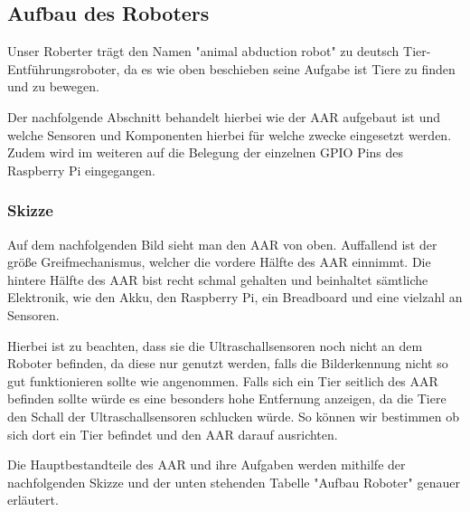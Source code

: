 \subsection{Aufbau des Roboters}

Unser Roberter trägt den Namen "animal abduction robot" zu deutsch Tier-Entführungsroboter, da es wie oben beschieben seine Aufgabe ist Tiere zu finden und zu bewegen.

Der nachfolgende Abschnitt behandelt hierbei wie der AAR aufgebaut ist und welche Sensoren und Komponenten hierbei für welche zwecke eingesetzt werden. Zudem wird im weiteren auf die Belegung der einzelnen GPIO Pins des Raspberry Pi eingegangen.

\subsubsection{Skizze}

Auf dem nachfolgenden Bild sieht man den AAR von oben. Auffallend ist der größe Greifmechanismus, welcher die vordere Hälfte des AAR einnimmt. Die hintere Hälfte des AAR bist recht schmal gehalten und beinhaltet sämtliche Elektronik, wie den Akku, den Raspberry Pi, ein Breadboard und eine vielzahl an Sensoren. 

Hierbei ist zu beachten, dass sie die Ultraschallsensoren noch nicht an dem Roboter befinden, da diese nur genutzt werden, falls die Bilderkennung nicht so gut funktionieren sollte wie angenommen.
Falls sich ein Tier seitlich des AAR befinden sollte würde es eine besonders hohe Entfernung anzeigen, da die Tiere den Schall der Ultraschallsensoren schlucken würde. So können wir bestimmen ob sich dort ein Tier befindet und den AAR darauf ausrichten. 

Die Hauptbestandteile des AAR und ihre Aufgaben werden mithilfe der nachfolgenden Skizze und der unten stehenden Tabelle "Aufbau Roboter" genauer erläutert.


